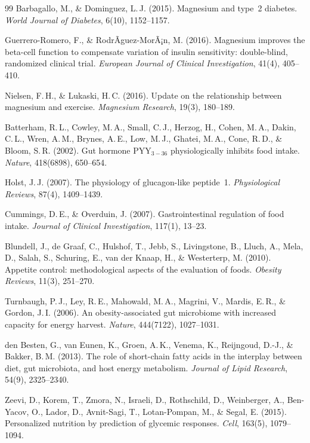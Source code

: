 ﻿\documentclass[12pt,a4paper]{article}
\theoremstyle{plain}
\theoremstyle{definition}
\theoremstyle{remark}
\begin{document}
\begin{thebibliography}{99}
Barbagallo, M., \& Dominguez, L.\,J. (2015).
Magnesium and type~2 diabetes.
\textit{World Journal of Diabetes}, 6(10), 1152--1157.

Guerrero-Romero, F., \& RodrÃ­guez-MorÃ¡n, M. (2016).
Magnesium improves the beta-cell function to compensate variation of insulin
sensitivity: double-blind, randomized clinical trial.
\textit{European Journal of Clinical Investigation}, 41(4), 405--410.

Nielsen, F.\,H., \& Lukaski, H.\,C. (2016).
Update on the relationship between magnesium and exercise.
\textit{Magnesium Research}, 19(3), 180--189.

Batterham, R.\,L., Cowley, M.\,A., Small, C.\,J., Herzog, H.,
Cohen, M.\,A., Dakin, C.\,L., Wren, A.\,M., Brynes, A.\,E., Low, M.\,J.,
Ghatei, M.\,A., Cone, R.\,D., \& Bloom, S.\,R. (2002).
Gut hormone PYY$_{3-36}$ physiologically inhibits food intake.
\textit{Nature}, 418(6898), 650--654.

Holst, J.\,J. (2007).
The physiology of glucagon-like peptide~1.
\textit{Physiological Reviews}, 87(4), 1409--1439.

Cummings, D.\,E., \& Overduin, J. (2007).
Gastrointestinal regulation of food intake.
\textit{Journal of Clinical Investigation}, 117(1), 13--23.

Blundell, J., de Graaf, C., Hulshof, T., Jebb, S., Livingstone, B.,
Lluch, A., Mela, D., Salah, S., Schuring, E., van der Knaap, H., \&
Westerterp, M. (2010).
Appetite control: methodological aspects of the evaluation of foods.
\textit{Obesity Reviews}, 11(3), 251--270.

Turnbaugh, P.\,J., Ley, R.\,E., Mahowald, M.\,A., Magrini, V.,
Mardis, E.\,R., \& Gordon, J.\,I. (2006).
An obesity-associated gut microbiome with increased capacity for
energy harvest.
\textit{Nature}, 444(7122), 1027--1031.

den Besten, G., van Eunen, K., Groen, A.\,K., Venema, K., Reijngoud,
D.-J., \& Bakker, B.\,M. (2013).
The role of short-chain fatty acids in the interplay between diet, gut
microbiota, and host energy metabolism.
\textit{Journal of Lipid Research}, 54(9), 2325--2340.

Zeevi, D., Korem, T., Zmora, N., Israeli, D., Rothschild, D.,
Weinberger, A., Ben-Yacov, O., Lador, D., Avnit-Sagi, T.,
Lotan-Pompan, M., \& Segal, E. (2015).
Personalized nutrition by prediction of glycemic responses.
\textit{Cell}, 163(5), 1079--1094.


\end{thebibliography}
\end{document}
